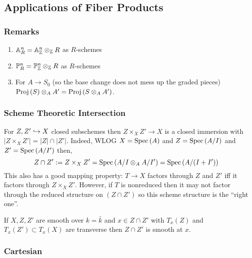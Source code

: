 \documentclass[12pt]{article}
\begin{document}
\subsection{Applications of Fiber Products}

\subsubsection{Remarks}

\begin{enumerate}
\item $\mathbb{A}^n_R = \mathbb{A}^n_{\mathbb{Z}} \otimes_{\mathbb{Z}} R$ as $R$-schemes
\item $\mathbb{P}^n_R = \mathbb{P}^n_{\mathbb{Z}} \otimes_{\mathbb{Z}} R$ as $R$-schemes
\item For $A \to S_0$ (so the base change does not mess up the graded pieces) $\mathrm{Proj}\left( S \right) \otimes_A A' = \mathrm{Proj}\left( S \otimes_A A' \right)$.
\end{enumerate}

\subsubsection{Scheme Theoretic Intersection}

For $Z, Z' \hookrightarrow X$ closed subschemes then $Z \times_X Z' \to X$ is a closed immersion with $|Z \times_X Z'| = |Z| \cap |Z'|$. Indeed, WLOG $X = \mathrm{Spec}\left( A \right)$ and $Z = \mathrm{Spec}\left( A/I \right)$ and $Z' = \mathrm{Spec}\left( A/I' \right)$ then,
\[ Z \cap Z' := Z \times_X Z' = \mathrm{Spec}\left( A/I \otimes_A A/I' \right) = \mathrm{Spec}\left( A/(I + I') \right) \]
This also has a good mapping property: $T \to X$ factors through $Z$ and $Z'$ iff it factors through $Z \times_X Z'$. However, if $T$ is nonreduced then it may not factor through the reduced structure on $(Z \cap Z')$ so this scheme structure is the ``right one''. 

\begin{rmk}
If $X, Z, Z'$ are smooth over $k = \bar{k}$ and $x \in Z \cap Z'$ with $T_x(Z)$ and $T_x(Z') \subset T_x(X)$ are transverse then $Z \cap Z'$ is smooth at $x$.
\end{rmk}

\subsubsection{Cartesian}
\end{document}
